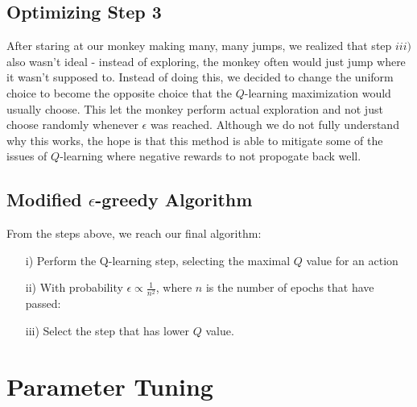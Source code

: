 \documentclass[10pt, oneside]{article}
\begin{document}
\subsection{Optimizing Step 3}
After staring at our monkey making many, many jumps, we realized that step $iii)$ also wasn't ideal - instead of exploring, the monkey often would just jump where it wasn't supposed to. Instead of doing this, we decided to change the uniform choice to become the opposite choice that the $Q$-learning maximization would usually choose. This let the monkey perform actual exploration and not just choose randomly whenever $\epsilon$ was reached. Although we do not fully understand why this works, the hope is that this method is able to mitigate some of the issues of $Q$-learning where negative rewards to not propogate back well.

\subsection{Modified $\epsilon$-greedy Algorithm}
From the steps above, we reach our final algorithm:
\begin{enumerate}
\item[i)] Perform the Q-learning step, selecting the maximal $Q$ value for an action
\item[ii)] With probability $\epsilon \propto \frac{1}{n^2}$, where $n$ is the number of epochs that have passed:
\item[iii)] Select the step that has lower $Q$ value.
\end{enumerate}

\section{Parameter Tuning}
\end{document}
